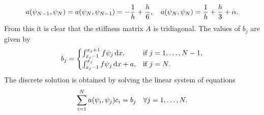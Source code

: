 \documentclass[english]{exercise}
\begin{document}
\begin{enumerate}
        \[
            a\parentheses*{\psi_{N - 1}, \psi_N} = a\parentheses*{\psi_N, \psi_{N - 1}} = -\frac{1}{h} + \frac{h}{6}, \quad a\parentheses*{\psi_N, \psi_N} = \frac{1}{h} + \frac{h}{3} + \alpha.
        \]
        From this it is clear that the stiffness matrix \(A\) is tridiagonal.
        The values of \(b_j\) are given by
        \[
            b_j = \begin{cases}
                \int_{x_j - 1}^{x_j + 1}f\psi_j\mathop{\mathrm{d}\!} x, & \text{if }j = 1, \ldots, N - 1,\\
                \int_{x_j - 1}^{x_j}f\psi_j\mathop{\mathrm{d}\!} x + a, & \text{if }j = N.
            \end{cases}
        \]
        The discrete solution is obtained by solving the linear system of equations
        \[
            \sum_{i = 1}^N a\parentheses*{\psi_i, \psi_j}c_i = b_j \quad \forall j = 1, \ldots, N.
        \]
    \end{enumerate}
    
    
    \section{}
    
\end{document}
